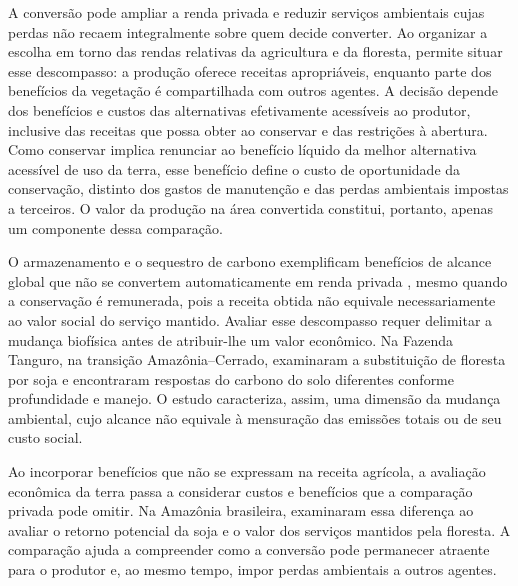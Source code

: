 A conversão pode ampliar a renda privada e reduzir serviços ambientais cujas perdas não recaem integralmente sobre quem decide converter. Ao organizar a escolha em torno das rendas relativas da agricultura e da floresta,  permite situar esse descompasso: a produção oferece receitas apropriáveis, enquanto parte dos benefícios da vegetação é compartilhada com outros agentes. A decisão depende dos benefícios e custos das alternativas efetivamente acessíveis ao produtor, inclusive das receitas que possa obter ao conservar e das restrições à abertura. Como conservar implica renunciar ao benefício líquido da melhor alternativa acessível de uso da terra, esse benefício define o custo de oportunidade da conservação, distinto dos gastos de manutenção e das perdas ambientais impostas a terceiros. O valor da produção na área convertida constitui, portanto, apenas um componente dessa comparação.

O armazenamento e o sequestro de carbono exemplificam benefícios de alcance global que não se convertem automaticamente em renda privada \cite{Angelsen2010}, mesmo quando a conservação é remunerada, pois a receita obtida não equivale necessariamente ao valor social do serviço mantido. Avaliar esse descompasso requer delimitar a mudança biofísica antes de atribuir-lhe um valor econômico. Na Fazenda Tanguro, na transição Amazônia--Cerrado,  examinaram a substituição de floresta por soja e encontraram respostas do carbono do solo diferentes conforme profundidade e manejo. O estudo caracteriza, assim, uma dimensão da mudança ambiental, cujo alcance não equivale à mensuração das emissões totais ou de seu custo social.

Ao incorporar benefícios que não se expressam na receita agrícola, a avaliação econômica da terra passa a considerar custos e benefícios que a comparação privada pode omitir. Na Amazônia brasileira,  examinaram essa diferença ao avaliar o retorno potencial da soja e o valor dos serviços mantidos pela floresta. A comparação ajuda a compreender como a conversão pode permanecer atraente para o produtor e, ao mesmo tempo, impor perdas ambientais a outros agentes.

